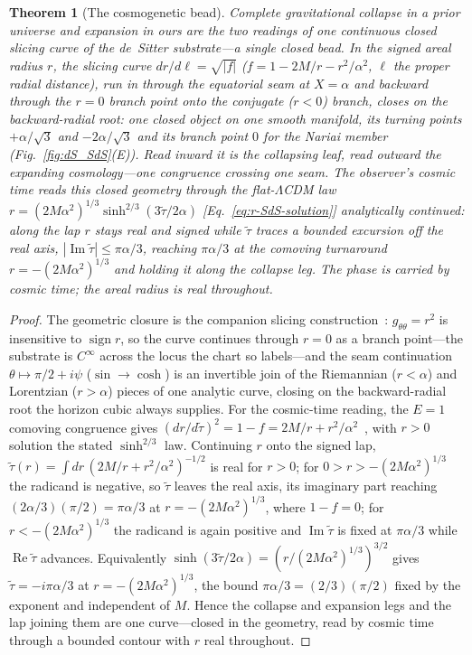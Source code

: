 \documentclass[11pt,a4paper]{article}
\theoremstyle{plain}
\newtheorem{theorem}{Theorem}
\theoremstyle{definition}
\theoremstyle{remark}
\begin{document}
\begin{theorem}[The cosmogenetic bead]\label{thm:bead}
Complete gravitational collapse in a prior universe and expansion in ours are the two readings of one continuous closed slicing curve of the de~Sitter substrate---a single closed \emph{bead}. In the signed areal radius $r$, the slicing curve $dr/d\ell=\sqrt{|f|}$ ($f=1-2M/r-r^2/\alpha^2$, $\ell$ the proper radial distance), run in through the equatorial seam at $X=\alpha$ and backward through the $r=0$ branch point onto the conjugate ($r<0$) branch, closes on the backward-radial root: one closed object on one smooth manifold, its turning points $+\alpha/\sqrt3$ and $-2\alpha/\sqrt3$ and its branch point $0$ for the Nariai member (Fig.~\ref{fig:dS_SdS}(E)). Read inward it is the collapsing leaf, read outward the expanding cosmology---one congruence crossing one seam. The observer's cosmic time reads this closed geometry through the flat-$\Lambda$CDM law $r=(2M\alpha^2)^{1/3}\sinh^{2/3}(3\tilde\tau/2\alpha)$ [Eq.~\eqref{eq:r-SdS-solution}] analytically continued: along the lap $r$ stays real and signed while $\tilde\tau$ traces a \emph{bounded} excursion off the real axis, $|\!\operatorname{Im}\tilde\tau|\le\pi\alpha/3$, reaching $\pi\alpha/3$ at the comoving turnaround $r=-(2M\alpha^2)^{1/3}$ and holding it along the collapse leg. The phase is carried by cosmic time; the areal radius is real throughout.
\end{theorem}

\begin{proof}
The geometric closure is the companion slicing construction~\cite{JanzenSlicing}: $g_{\theta\theta}=r^2$ is insensitive to $\operatorname{sign}r$, so the curve continues through $r=0$ as a branch point---the substrate is $C^\infty$ across the locus the chart so labels---and the seam continuation $\theta\mapsto\pi/2+i\psi$ ($\sin\to\cosh$) is an invertible join of the Riemannian ($r<\alpha$) and Lorentzian ($r>\alpha$) pieces of one analytic curve, closing on the backward-radial root the horizon cubic always supplies. For the cosmic-time reading, the $E{=}1$ comoving congruence gives $(dr/d\tilde\tau)^2=1-f=2M/r+r^2/\alpha^2$~\cite{JanzenOperator,JanzenCanonicalTime}, with $r>0$ solution the stated $\sinh^{2/3}$ law. Continuing $r$ onto the signed lap, $\tilde\tau(r)=\int dr\,(2M/r+r^2/\alpha^2)^{-1/2}$ is real for $r>0$; for $0>r>-(2M\alpha^2)^{1/3}$ the radicand is negative, so $\tilde\tau$ leaves the real axis, its imaginary part reaching $(2\alpha/3)(\pi/2)=\pi\alpha/3$ at $r=-(2M\alpha^2)^{1/3}$, where $1-f=0$; for $r<-(2M\alpha^2)^{1/3}$ the radicand is again positive and $\operatorname{Im}\tilde\tau$ is fixed at $\pi\alpha/3$ while $\operatorname{Re}\tilde\tau$ advances. Equivalently $\sinh(3\tilde\tau/2\alpha)=(r/(2M\alpha^2)^{1/3})^{3/2}$ gives $\tilde\tau=-i\pi\alpha/3$ at $r=-(2M\alpha^2)^{1/3}$, the bound $\pi\alpha/3=(2/3)(\pi/2)$ fixed by the exponent and independent of $M$. Hence the collapse and expansion legs and the lap joining them are one curve---closed in the geometry, read by cosmic time through a bounded contour with $r$ real throughout.
\end{proof}
\end{document}
